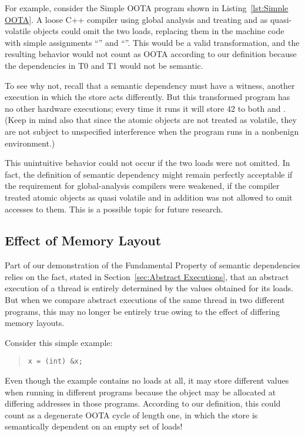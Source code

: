 For example, consider the Simple OOTA program shown in
Listing~\ref{lst:Simple OOTA}.
A loose C++ compiler using global analysis and treating  and  as
quasi-volatile objects could omit the two loads, replacing them in the
machine code with simple assignments ``'' and
``''.
This would be a valid transformation, and the resulting behavior would
not count as OOTA according to our definition because the
dependencies in T0 and T1 would not be semantic.

To see why not, recall that a semantic dependency must have a witness,
another execution in which the store acts differently.
But this transformed program has no other hardware executions; every time it
runs it will store 42 to both  and .
(Keep in mind also that since the atomic objects are not treated as
volatile, they are not subject to unspecified interference when the
program runs in a nonbenign environment.)

This unintuitive behavior could not occur if the two loads were not
omitted.
In fact, the definition of semantic dependency might remain
perfectly acceptable if the requirement for global-analysis compilers
were weakened, if the compiler treated atomic objects as quasi
volatile and in addition was not allowed to omit accesses to them.
This is a possible topic for future research.

\subsection{Effect of Memory Layout}
\label{sec:Effect of Memory Layout}

Part of our demonstration of the Fundamental Property of semantic
dependencies relies on the fact, stated in
Section~\ref{sec:Abstract Executions},
that an abstract execution of a thread is entirely determined by the
values obtained for its loads.
But when we compare abstract executions of the same thread in two
different programs, this may no longer be entirely true owing to the
effect of differing memory layouts.

Consider this simple example:
\begin{quote}
\begin{verbatim}
x = (int) &x;
\end{verbatim}
\end{quote}
Even though the example contains no loads at all, it may store
different values when running in different programs because the
object  may be allocated at differing addresses in those
programs.
According to our definition, this could count as a degenerate OOTA
cycle of length one, in which the store is semantically dependent on
an empty set of loads!

